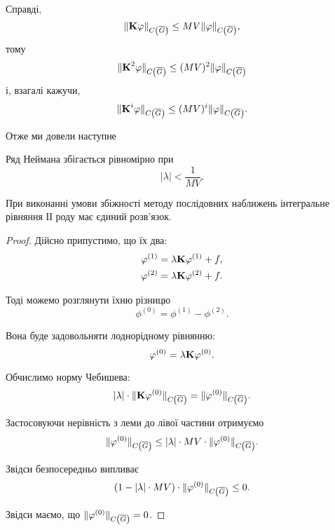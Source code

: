 Справді,
\begin{equation}
	\| \bf{K} \phi\|_{\CoG} \le MV \|\phi\|_{\CoG},
\end{equation}
тому
\begin{equation}
	\|\bf{K}^2\phi\|_{\CoG} \le (MV)^2 \|\phi\|_{\CoG}
\end{equation} 
і, взагалі кажучи,
\begin{equation}
	\|\bf{K}^i\phi\|_{\CoG} \le (MV)^i \|\phi\|_{\CoG}.
\end{equation}

Отже ми довели наступне
\begin{proposition}
	Ряд Неймана збігається рівномірно при 	
	\begin{equation}
		|\lambda| < \dfrac{1}{MV}.
	\end{equation} 
\end{proposition}

\begin{lemma}
	При виконанні умови збіжності методу послідовних наближень інтегральне рівняння ІІ роду має єдиний розв'язок.
\end{lemma}

\begin{proof}
	Дійсно припустимо, що їх два:
	\begin{equation}
		\begin{aligned}
			\phi^{(1)} &= \lambda \bf{K} \phi^{(1)} + f, \\
			\phi^{(2)} &= \lambda \bf{K} \phi^{(2)} + f.
		\end{aligned}
	\end{equation}

	Тоді можемо розглянути їхню різницю
	\begin{equation}
		\phi^{(0)} = \phi^{(1)} - \phi^{(2)}.
	\end{equation}

	Вона буде задовольняти лоднорідному рівнянню:
	\begin{equation}
		\phi^{(0)} = \lambda \bf{K} \phi^{(0)}.
	\end{equation}

	Обчислимо норму Чебишева:
	\begin{equation}
		|\lambda| \cdot \|\bf{K} \phi^{(0)}\|_{\CoG} = \| \phi^{(0)} \|_{\CoG}.
	\end{equation}

	Застосовуючи нерівність з леми до лівої частини отримуємо
	\begin{equation}
		\| \phi^{(0)} \|_{\CoG} \le |\lambda| \cdot MV \cdot \|\phi^{(0)}\|_{\CoG}.
	\end{equation}

	Звідси безпосередньо випливає
	\begin{equation}
		(1 - |\lambda| \cdot MV) \cdot \|\phi^{(0)}\|_{\CoG} \le 0.
	\end{equation}

	Звідси маємо, що $\|\phi^{(0)}\|_{\CoG} = 0$.
\end{proof}

